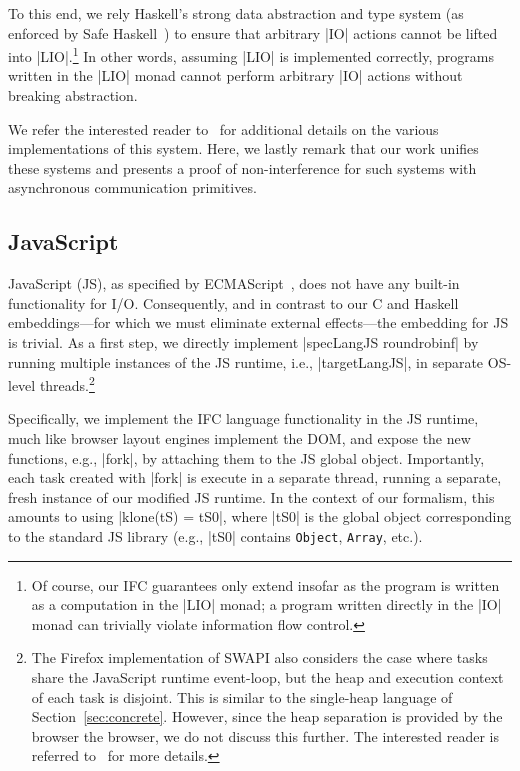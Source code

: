 To this end, we rely Haskell's strong data abstraction and type system
(as enforced by Safe Haskell~\cite{Terei:2012:SH:2364506.2364524}) to
ensure that arbitrary |IO| actions cannot be lifted into
|LIO|.\footnote{
Of course, our IFC guarantees only extend insofar as the program is
written as a computation in the |LIO| monad; a program written
directly in the |IO| monad can trivially violate information flow
control.
}
%
In other words, assuming |LIO| is implemented correctly, programs
written in the |LIO| monad cannot perform arbitrary |IO| actions
without breaking abstraction.
 
We refer the interested reader to~\cite{lio,stefan:addressing-covert} for
additional details on the various implementations of this system.
%
Here, we lastly remark that our work unifies these systems and
presents a proof of non-interference for such systems with asynchronous
communication primitives.


\subsection{JavaScript}
\label{sec:real:js}

JavaScript (JS), as specified by ECMAScript~\tocite{}, does not have any
built-in functionality for I/O.
%
Consequently, and in contrast to our C and Haskell embeddings---for
which we must eliminate external effects---the embedding for JS is
trivial.
%
As a first step, we directly implement |specLangJS roundrobinf| by
running multiple instances of the JS runtime, i.e., |targetLangJS|, in
separate OS-level threads.\footnote{
 The Firefox implementation of SWAPI also considers the case where
 tasks share the JavaScript runtime event-loop, but the heap and
 execution context of each task is disjoint. This is similar to the
 single-heap language of Section~\ref{sec:concrete}.  However, since the heap
 separation is provided by the browser the browser, we do not discuss
 this further. The interested reader is referred to~\tocite{} for more
 details.
}

Specifically, we implement the IFC language functionality in the JS
runtime, much like browser layout engines implement the DOM, and
expose the new functions, e.g., |fork|, by attaching them to the JS
global object.
%
Importantly, each task created with |fork| is execute in a separate
thread, running a separate, fresh instance of our modified JS runtime.
%
In the context of our formalism, this amounts to using |klone(tS) =
tS0|, where |tS0| is the global object corresponding to the standard
JS library (e.g., |tS0| contains \texttt{Object}, \texttt{Array},
etc.).

